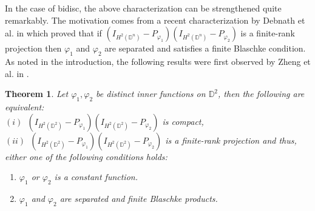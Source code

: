 \documentclass[12pt, a4 paper]{amsart}
\newcommand{\D}{\mathbb{D}}
\theoremstyle{definition}
\theoremstyle{plain}
\newtheorem{thm}{Theorem}[section]
\theoremstyle{definition}
\numberwithin{equation}{section}
\let\phi=\varphi
\begin{document}
In the case of bidisc, the above characterization can be strengthened quite remarkably. The motivation comes from a recent characterization by Debnath et al. in \cite{DPS} which proved that if $(I_{H^2(\D^n)}  - P_{\phi_1})(I_{H^2(\D^n)}  - P_{\phi_2})$ is a finite-rank projection then $\phi_1$ and $\phi_2$ are separated and satisfies a finite Blaschke condition. As noted in the introduction, the following results were first observed by Zheng et al. in \cite{ZTLYZ}.
\begin{thm}\label{compact-proj1}
Let $\phi_1, \phi_2$ be distinct inner functions on $\D^2$, then the following are equivalent:\\ \vspace{1mm}
$(i)$~$(I_{H^2(\D^2)}  - P_{\phi_1})(I_{H^2(\D^2)}  - P_{\phi_2})$ is compact,\\ \vspace{1mm}
$(ii)$~$(I_{H^2(\D^2)} - P_{\phi_1})(I_{H^2(\D^2)}  - P_{\phi_2})$ is a finite-rank projection and thus, either one of the following conditions holds: 
\begin{enumerate}
\item[(a)] $\phi_1$ or $\phi_2$ is a constant function.
\item[(b)]$\phi_1$ and $\phi_2$ are separated and finite Blaschke products.
\end{enumerate}
\end{thm}
\end{document}
